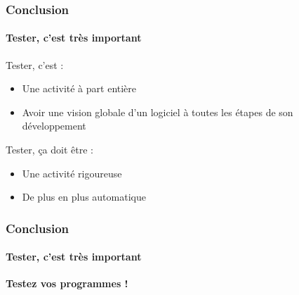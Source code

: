 \documentclass{beamer}
\begin{document}
\begin{frame}
	\frametitle{Conclusion}
	\framesubtitle{Tester, c'est tr\`{e}s important}
	
		Tester, c'est :
		\begin{itemize}
			\item Une activit\'{e} \`{a} part enti\`{e}re
			\item Avoir une vision globale d'un logiciel \`{a} toutes les \'{e}tapes de son d\'{e}veloppement
		\end{itemize}
		
		\bigskip
		
		Tester, \c{c}a doit \^{e}tre :
		\begin{itemize}	
			\item Une activit\'{e} rigoureuse
			\item De plus en plus automatique
		\end{itemize}
\end{frame}

\begin{frame}
	\frametitle{Conclusion}
	\framesubtitle{Tester, c'est tr\`{e}s important}
	
	\textbf{Testez vos programmes !}
	
\end{frame}		
\end{document}
